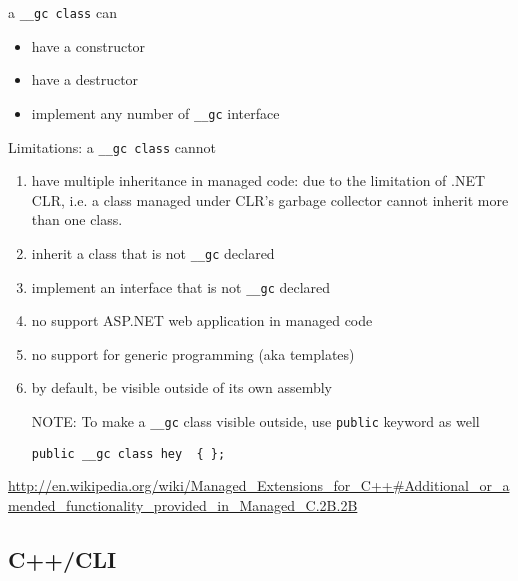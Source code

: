 \begin{mdframed}

a \verb!__gc class! can 
\begin{itemize}
  \item have a constructor
  \item have a destructor
  \item implement any number of \verb!__gc! interface
\end{itemize}


Limitations: a \verb!__gc class! cannot
\begin{enumerate}
  \item  have multiple inheritance in managed code: due to the limitation of .NET CLR, i.e. a class managed under CLR's garbage collector cannot inherit more than one class.
  \item inherit a class that is not \verb!__gc! declared
  \item implement an interface that is not \verb!__gc! declared  
  \item no support ASP.NET web application in managed code
  \item no support for generic programming (aka templates)
  
  \item by default, be visible outside of its own assembly    
  
NOTE: To make a \verb!__gc! class visible outside, use \verb!public! keyword as well
\begin{verbatim}
public __gc class hey  { };
\end{verbatim}
\end{enumerate}
\end{mdframed}
\url{http://en.wikipedia.org/wiki/Managed_Extensions_for_C++\#Additional_or_amended_functionality_provided_in_Managed_C.2B.2B}

\subsection{C++/CLI}
\label{sec:C++/CLI}

